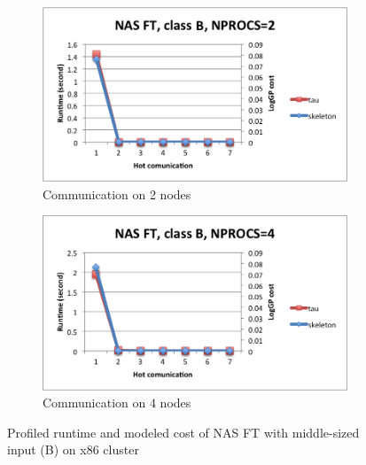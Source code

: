 \begin{figure}
{\scriptsize
\begin{subfigure}{.48\textwidth}
\centering
\includegraphics[width=.9\textwidth]{fig/blues/ft_B_2_model.png}
\caption{Communication on 2 nodes}
\label{fig:model:ft:B:2}
\end{subfigure}
\begin{subfigure}{.48\textwidth}
\centering
\includegraphics[width=.9\textwidth]{fig/blues/ft_B_4_model.png}
\caption{Communication on 4 nodes}
\label{fig::modelft:B:4}
\end{subfigure}
\caption{Profiled runtime and modeled cost of NAS FT with middle-sized input (B) on x86 cluster}
\label{fig:model:ft:B}
}
\end{figure}

